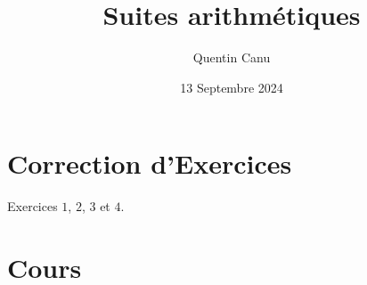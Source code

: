 \documentclass{article}
\title{Suites arithmétiques}
\date{13 Septembre 2024}
\author{Quentin Canu}
\begin{document}
\maketitle

\section{Correction d'Exercices}
Exercices $1$, $2$, $3$ et $4$.
\section{Cours}
\end{document}
